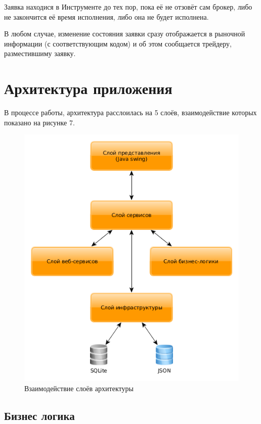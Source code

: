 \documentclass[a4paper, 12pt]{article}        %
\begin{document}
Заявка находися в Инструменте до тех пор, пока её не отзовёт сам брокер, либо не закончится её время исполнения, либо она не будет исполнена.

В любом случае, изменение состояния заявки сразу отображается в рыночной информации (с соответствующим кодом) и об этом сообщается трейдеру, разместившиму заявку.

\newpage
\section{Архитектура приложения}

В процессе работы, архитектура расслоилась на 5 слоёв, взаимодействие которых показано на рисунке 7.

\begin{figure}[h!]
\centering
\includegraphics[scale=0.8]{res/pic09}
\caption{Взаимодействие слоёв архитектуры}
\end{figure}

\subsection{Бизнес логика}
\end{document}
